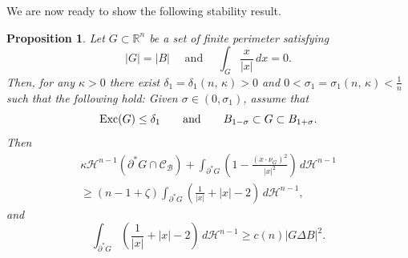 \documentclass[reqno,11pt]{amsart}
\makeatletter
\def\dz{\delta}
\def\sz{\sigma}
\newtheorem{prop}[thm]{Proposition}%
\numberwithin{equation}{section}
\theoremstyle{remark}
\makeatother
\begin{document}
 
We are now ready to show the following stability result. 
\begin{prop}\label{stability sets}
Let $G\subset \mathbb R^n$ be a set of finite perimeter satisfying
\begin{equation}\label{normalize G}
|G|=|B| \quad \text{ and } \quad \int_G \frac{x}{|x|}\,dx=0. 
\end{equation}
Then, for any $\kappa>0$ there exist $\delta_1=\dz_1(n,\,\kappa)>0$ and $0<\sz_1=\sz_1(n,\,\kappa)<\frac 1 n$ such that the following hold: Given $\sigma \in (0,\sz_1)$, assume that
$${\rm Exc}(G)\le \dz_1 \qquad \text{and}\qquad B_{1-\sz}\subset G\subset B_{1+\sz}.$$
Then
\begin{multline}\label{eq:kappa G1}
 \kappa \mathscr H^{n-1}(\partial^* G\cap \mathcal{C}_{\mathcal B})+ \int_{\partial^* G  } \left(1-\frac{(x\cdot \nu_G)^2}{|x|^2}\right) \, d\mathscr H^{n-1}  \\
 \ge (n-1+\zeta)\int_{\partial^* G} \left(\frac{1}{|x|}+|x|-2\right)  \,  d\mathscr H^{n-1},
\end{multline}
and
$$ \int_{\partial^*  G}   \left(\frac{1}{|x|}+|x|-2\right)\, d\mathscr H^{n-1}\ge c(n)| G\Delta B|^2.$$
\end{prop}
\end{document}
